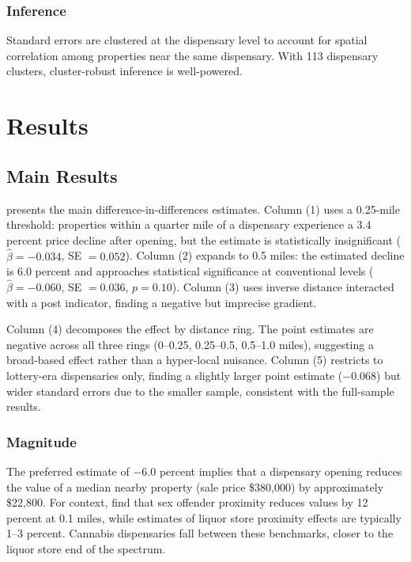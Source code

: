 \documentclass[12pt]{article}
\begin{document}
\subsubsection*{Inference} Standard errors are clustered at the dispensary level to account for spatial correlation among properties near the same dispensary. With 113 dispensary clusters, cluster-robust inference is well-powered.


\section{Results}

\subsection{Main Results}

 presents the main difference-in-differences estimates. Column (1) uses a 0.25-mile threshold: properties within a quarter mile of a dispensary experience a 3.4 percent price decline after opening, but the estimate is statistically insignificant ($\hat{\beta} = -0.034$, SE $= 0.052$). Column (2) expands to 0.5 miles: the estimated decline is 6.0 percent and approaches statistical significance at conventional levels ($\hat{\beta} = -0.060$, SE $= 0.036$, $p = 0.10$). Column (3) uses inverse distance interacted with a post indicator, finding a negative but imprecise gradient.



Column (4) decomposes the effect by distance ring. The point estimates are negative across all three rings (0--0.25, 0.25--0.5, 0.5--1.0 miles), suggesting a broad-based effect rather than a hyper-local nuisance. Column (5) restricts to lottery-era dispensaries only, finding a slightly larger point estimate ($-0.068$) but wider standard errors due to the smaller sample, consistent with the full-sample results.

\subsubsection*{Magnitude} The preferred estimate of $-6.0$ percent implies that a dispensary opening reduces the value of a median nearby property (sale price \$380,000) by approximately \$22,800. For context, \citet{lindenrockoff2008} find that sex offender proximity reduces values by 12 percent at 0.1 miles, while estimates of liquor store proximity effects are typically 1--3 percent. Cannabis dispensaries fall between these benchmarks, closer to the liquor store end of the spectrum.
\end{document}

